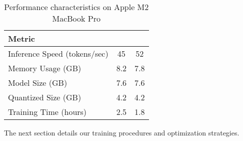 \begin{table}[H]
\centering
\begin{tabular}{lcc}
\toprule
Metric & \supra{} & \zennano{} \\
\midrule
Inference Speed (tokens/sec) & 45 & 52 \\
Memory Usage (GB) & 8.2 & 7.8 \\
Model Size (GB) & 7.6 & 7.6 \\
Quantized Size (GB) & 4.2 & 4.2 \\
Training Time (hours) & 2.5 & 1.8 \\
\bottomrule
\end{tabular}
\caption{Performance characteristics on Apple M2 MacBook Pro}
\label{tab:performance}
\end{table}

The next section details our training procedures and optimization strategies.